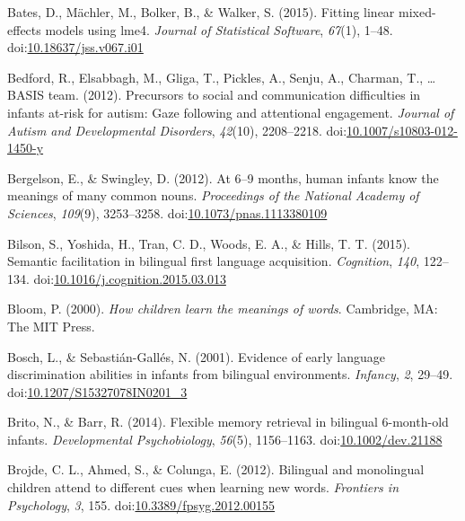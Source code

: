 \documentclass[,man,floatsintext]{apa6}
\begin{document}
\leavevmode\hypertarget{ref-Bates_etal_2015}{}%
Bates, D., Mächler, M., Bolker, B., \& Walker, S. (2015). Fitting linear mixed-effects models using lme4. \emph{Journal of Statistical Software}, \emph{67}(1), 1--48. doi:\href{https://doi.org/10.18637/jss.v067.i01}{10.18637/jss.v067.i01}

\leavevmode\hypertarget{ref-Bedford_etal_2012}{}%
Bedford, R., Elsabbagh, M., Gliga, T., Pickles, A., Senju, A., Charman, T., \ldots{} BASIS team. (2012). Precursors to social and communication difficulties in infants at-risk for autism: Gaze following and attentional engagement. \emph{Journal of Autism and Developmental Disorders}, \emph{42}(10), 2208--2218. doi:\href{https://doi.org/10.1007/s10803-012-1450-y}{10.1007/s10803-012-1450-y}

\leavevmode\hypertarget{ref-Bergelson_Swingley_2012}{}%
Bergelson, E., \& Swingley, D. (2012). At 6--9 months, human infants know the meanings of many common nouns. \emph{Proceedings of the National Academy of Sciences}, \emph{109}(9), 3253--3258. doi:\href{https://doi.org/10.1073/pnas.1113380109}{10.1073/pnas.1113380109}

\leavevmode\hypertarget{ref-Bilson_etal_2015}{}%
Bilson, S., Yoshida, H., Tran, C. D., Woods, E. A., \& Hills, T. T. (2015). Semantic facilitation in bilingual first language acquisition. \emph{Cognition}, \emph{140}, 122--134. doi:\href{https://doi.org/10.1016/j.cognition.2015.03.013}{10.1016/j.cognition.2015.03.013}

\leavevmode\hypertarget{ref-Bloom_2000}{}%
Bloom, P. (2000). \emph{How children learn the meanings of words}. Cambridge, MA: The MIT Press.

\leavevmode\hypertarget{ref-Bosch_Sebastian-Galles_2001}{}%
Bosch, L., \& Sebastián-Gallés, N. (2001). Evidence of early language discrimination abilities in infants from bilingual environments. \emph{Infancy}, \emph{2}, 29--49. doi:\href{https://doi.org/10.1207/S15327078IN0201_3}{10.1207/S15327078IN0201\_3}

\leavevmode\hypertarget{ref-Brito_Barr_2014}{}%
Brito, N., \& Barr, R. (2014). Flexible memory retrieval in bilingual 6-month-old infants. \emph{Developmental Psychobiology}, \emph{56}(5), 1156--1163. doi:\href{https://doi.org/10.1002/dev.21188}{10.1002/dev.21188}

\leavevmode\hypertarget{ref-Brojde_etal_2012}{}%
Brojde, C. L., Ahmed, S., \& Colunga, E. (2012). Bilingual and monolingual children attend to different cues when learning new words. \emph{Frontiers in Psychology}, \emph{3}, 155. doi:\href{https://doi.org/10.3389/fpsyg.2012.00155}{10.3389/fpsyg.2012.00155}
\end{document}
